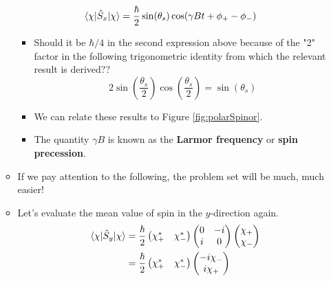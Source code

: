 \documentclass[../notes.tex]{subfiles}
\begin{document}
\begin{itemize}
\begin{itemize}
\begin{align*}
            \ev{\hat{S}_x}{\chi} &= \frac{\hbar}{2}\sin(\theta_s)\cos(\gamma Bt+\phi_+-\phi_-)
        \end{align*}
        \begin{itemize}
            \item Should it be $\hbar/4$ in the second expression above because of the "2" factor in the following trigonometric identity from which the relevant result is derived??
            \begin{equation*}
                2\sin(\frac{\theta_s}{2})\cos(\frac{\theta_s}{2}) = \sin(\theta_s)
            \end{equation*}
            \item We can relate these results to Figure \ref{fig:polarSpinor}.
            \item The quantity $\gamma B$ is known as the \textbf{Larmor frequency} or \textbf{spin precession}.
        \end{itemize}
        \item If we pay attention to the following, the problem set will be much, much easier!
        \item Let's evaluate the mean value of spin in the $y$-direction again.
        \begin{align*}
            \ev{\hat{S}_y}{\chi} &= \frac{\hbar}{2}
            \begin{pmatrix}
                \chi_+^* & \chi_-^*\\
            \end{pmatrix}
            \begin{pmatrix}
                0 & -i\\
                i & 0\\
            \end{pmatrix}
            \begin{pmatrix}
                \chi_+\\
                \chi_-\\
            \end{pmatrix}\\
            &= \frac{\hbar}{2}
            \begin{pmatrix}
                \chi_+^* & \chi_-^*\\
            \end{pmatrix}
            \begin{pmatrix}
                -i\chi_-\\
                i\chi_+\\
            \end{pmatrix}\\

\end{align*}
\end{itemize}
\end{itemize}
\end{document}
